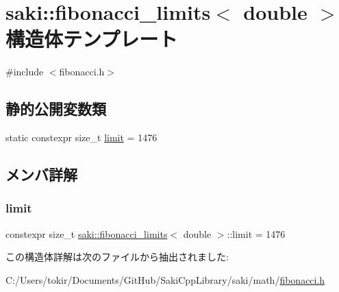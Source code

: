 \hypertarget{structsaki_1_1fibonacci__limits_3_01double_01_4}{}\section{saki\+:\+:fibonacci\+\_\+limits$<$ double $>$ 構造体テンプレート}
\label{structsaki_1_1fibonacci__limits_3_01double_01_4}


{\ttfamily \#include $<$fibonacci.\+h$>$}

\subsection*{静的公開変数類}
\begin{DoxyCompactItemize}
\item 
static constexpr size\+\_\+t \mbox{\hyperlink{structsaki_1_1fibonacci__limits_3_01double_01_4_a0cb14c0cd3e8fad78c671fc002d0c1b3}{limit}} = 1476
\end{DoxyCompactItemize}


\subsection{メンバ詳解}
\mbox{\label{structsaki_1_1fibonacci__limits_3_01double_01_4_a0cb14c0cd3e8fad78c671fc002d0c1b3}} 
\subsubsection{\texorpdfstring{limit}{limit}}
{\footnotesize\ttfamily constexpr size\+\_\+t \mbox{\hyperlink{structsaki_1_1fibonacci__limits}{saki\+::fibonacci\+\_\+limits}}$<$ double $>$\+::limit = 1476\hspace{0.3cm}{\ttfamily [static]}}



この構造体詳解は次のファイルから抽出されました\+:\begin{DoxyCompactItemize}
\item 
C\+:/\+Users/tokir/\+Documents/\+Git\+Hub/\+Saki\+Cpp\+Library/saki/math/\mbox{\hyperlink{fibonacci_8h}{fibonacci.\+h}}\end{DoxyCompactItemize}
